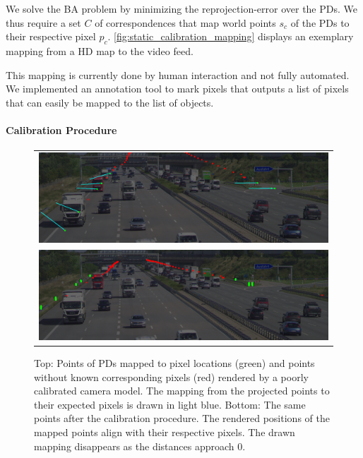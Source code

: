 We solve the BA problem by minimizing the reprojection-error over the PDs.
We thus require a set $C$ of correspondences that map world points $s_c$ of the PDs to their respective pixel $p_c$. 
\autoref{fig:static_calibration_mapping} displays an exemplary mapping from a HD map to the video feed.

This mapping is currently done by human interaction and not fully automated. 
We implemented an annotation tool to mark pixels that outputs a list of pixels that can easily be mapped to the list of objects.


\paragraph{Calibration Procedure}
\begin{figure}[t]
  \centering
  \begin{tabular}{c}
    \includegraphics[width=0.95\linewidth]{images/calibration/background_uncalibrated_with_mapping.png}    \\
    \includegraphics[width=0.95\linewidth]{images/calibration/background_calibrated.png}    
  \end{tabular}
  \caption{
    Top: Points of PDs mapped to pixel locations (green) and points without known corresponding pixels (red) rendered by a poorly calibrated camera model.
    The mapping from the projected points to their expected pixels is drawn in light blue.
    Bottom: The same points after the calibration procedure.
    The rendered positions of the mapped points align with their respective pixels.
    The drawn mapping disappears as the distances approach $0$.
   }
  \label{fig:static_calibration_calibration}
\end{figure}
  
